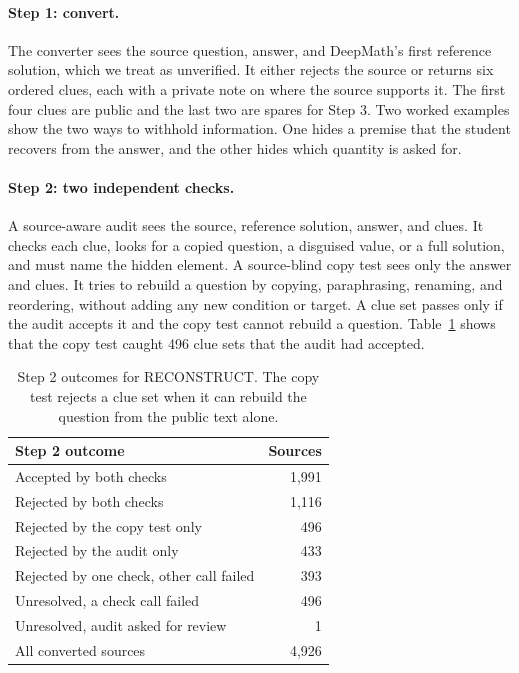 \documentclass[11pt]{article}
\begin{document}
\paragraph{Step 1: convert.} The converter sees the source question, answer, and DeepMath's first reference solution, which we treat as unverified. It either rejects the source or returns six ordered clues, each with a private note on where the source supports it. The first four clues are public and the last two are spares for Step 3. Two worked examples show the two ways to withhold information. One hides a premise that the student recovers from the answer, and the other hides which quantity is asked for.

\paragraph{Step 2: two independent checks.} A source-aware audit sees the source, reference solution, answer, and clues. It checks each clue, looks for a copied question, a disguised value, or a full solution, and must name the hidden element. A source-blind copy test sees only the answer and clues. It tries to rebuild a question by copying, paraphrasing, renaming, and reordering, without adding any new condition or target. A clue set passes only if the audit accepts it and the copy test cannot rebuild a question. Table~\ref{tab:recon-gate} shows that the copy test caught 496 clue sets that the audit had accepted.

\begin{table}[t]
\centering
\small
\setlength{\tabcolsep}{4pt}
\begin{tabular}{lr}
\toprule
Step 2 outcome & Sources \\
\midrule
Accepted by both checks & 1,991 \\
Rejected by both checks & 1,116 \\
Rejected by the copy test only & 496 \\
Rejected by the audit only & 433 \\
Rejected by one check, other call failed & 393 \\
Unresolved, a check call failed & 496 \\
Unresolved, audit asked for review & 1 \\
\midrule
All converted sources & 4,926 \\
\bottomrule
\end{tabular}
\caption{Step 2 outcomes for RECONSTRUCT. The copy test rejects a clue set when it can rebuild the question from the public text alone.}
\label{tab:recon-gate}
\end{table}
\end{document}
